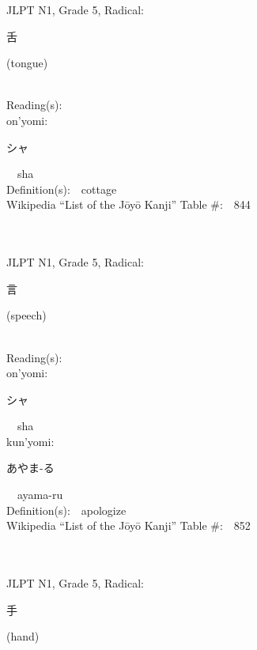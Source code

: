 \begin{multicols}{2}
{JLPT N1, Grade 5, Radical:\ \ {\begin{CJK}{UTF8}{min} 舌 \end{CJK}} (tongue) } \\
Reading(s):\ \ \\
{\hspace*{1em}}on'yomi:\ \ \\
{\hspace*{2em}}{\begin{CJK}{UTF8}{min} シャ \end{CJK}}\ \ sha\ \ \\
Definition(s):\ \ cottage \\
Wikipedia ``List of the J\=oy\=o Kanji'' Table \#:\ \ 844 \\
\ \ \\
{\fontsize{34pt}{40pt}  }\ \ \\  %
{JLPT N1, Grade 5, Radical:\ \ {\begin{CJK}{UTF8}{min} 言 \end{CJK}} (speech) } \\
Reading(s):\ \ \\
{\hspace*{1em}}on'yomi:\ \ \\
{\hspace*{2em}}{\begin{CJK}{UTF8}{min} シャ \end{CJK}}\ \ sha\ \ \\
{\hspace*{1em}}kun'yomi:\ \ \\
{\hspace*{2em}}{\begin{CJK}{UTF8}{min} あやま-る \end{CJK}}\ \ ayama-ru\ \ \\
Definition(s):\ \ apologize \\
Wikipedia ``List of the J\=oy\=o Kanji'' Table \#:\ \ 852 \\
\ \ \\
{\fontsize{34pt}{40pt}  }\ \ \\  %
{JLPT N1, Grade 5, Radical:\ \ {\begin{CJK}{UTF8}{min} 手 \end{CJK}} (hand) } \\

\end{multicols}
